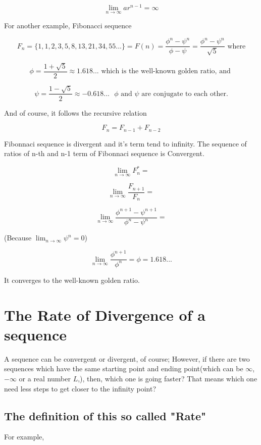 \documentclass{article}
\begin{document}
  \[
	  \lim_{n \to \infty} ar^{n-1} = \infty
  \]

  For another example, Fibonacci sequence

  \[
	  F_n = \{1, 1, 2, 3, 5, 8, 13, 21, 34, 55...\} = F(n) = \dfrac{\phi^n - \psi^n}{\phi - \psi} = \dfrac{\phi^n - \psi^n}{\sqrt{5}} \text{ where}
  \]

  \[
	  \phi = \dfrac{1+\sqrt{5}}{2} \approx 1.618... \text{ which is the well-known golden ratio, and }
  \]

  \[
	  \psi = \dfrac{1-\sqrt{5}}{2} \approx -0.618... \text{ } \phi \text{ and } \psi \text{ are conjugate to each other.}
  \]

  And of course, it follows the recursive relation

  \[
	  F_n = F_{n-1} + F_{n-2}
  \]

  Fibonnaci sequence is divergent and it's term tend to infinity. The sequence of ratios of n-th and n-1 term of Fibonnaci sequence is Convergent.

  \[
	  \lim_{n \to \infty} F_n^* =
  \]

  \[
	  \lim_{n \to \infty} \dfrac{F_{n+1}}{F_n} = 
  \]

  \[
	  \lim_{n \to \infty} \dfrac{\phi^{n+1} - \psi^{n+1}}{\phi^n - \psi^n} = 
  \]

  \begin{center}
	  (Because $\displaystyle \lim_{n \to \infty} \psi^n = 0$)
  \end{center}

  \[
	  \lim_{n \to \infty} \dfrac{\phi^{n+1}}{\phi^n} = \phi = 1.618...
  \]

  It converges to the well-known golden ratio.

  \section{The Rate of Divergence of a sequence}
  A sequence can be convergent or divergent, of course; However, if there are two sequences which have the same starting point and ending point(which can be $\infty$, $-\infty$ or a real number $L$,), then, which one is going faster? That means which one need less steps to get closer to the infinity point?

  \subsection{The definition of this so called "Rate"}

  For example, 
\end{document}
